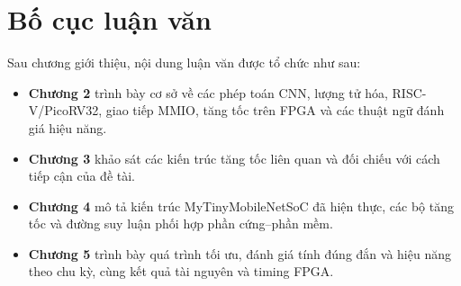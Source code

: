 \section{Bố cục luận văn}
Sau chương giới thiệu, nội dung luận văn được tổ chức như sau:
\begin{itemize}
    \item \textbf{Chương 2} trình bày cơ sở về các phép toán CNN, lượng tử hóa, RISC-V/PicoRV32, giao tiếp MMIO, tăng tốc trên FPGA và các thuật ngữ đánh giá hiệu năng.
    \item \textbf{Chương 3} khảo sát các kiến trúc tăng tốc liên quan và đối chiếu với cách tiếp cận của đề tài.
    \item \textbf{Chương 4} mô tả kiến trúc MyTinyMobileNetSoC đã hiện thực, các bộ tăng tốc và đường suy luận phối hợp phần cứng--phần mềm.
    \item \textbf{Chương 5} trình bày quá trình tối ưu, đánh giá tính đúng đắn và hiệu năng theo chu kỳ, cùng kết quả tài nguyên và timing FPGA.
\end{itemize}
